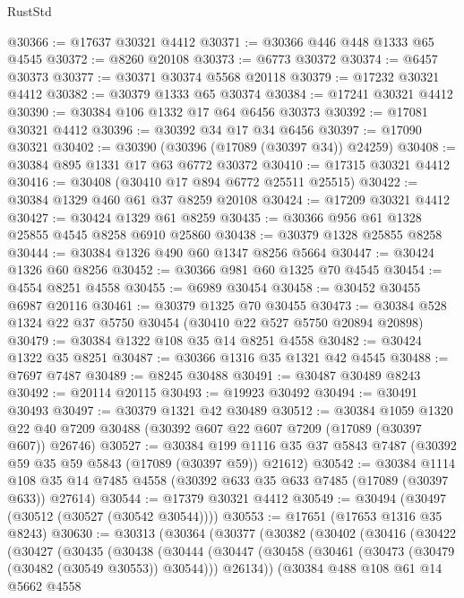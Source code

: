\begin{lexlean}{RustStd}
\begin{coremodule}
@30366 := @17637 @30321 @4412
@30371 := @30366 @446 @448 @1333 @65 @4545
@30372 := @8260 @20108
@30373 := @6773 @30372
@30374 := @6457 @30373
@30377 := @30371 @30374 @5568 @20118
@30379 := @17232 @30321 @4412
@30382 := @30379 @1333 @65 @30374
@30384 := @17241 @30321 @4412
@30390 := @30384 @106 @1332 @17 @64 @6456 @30373
@30392 := @17081 @30321 @4412
@30396 := @30392 @34 @17 @34 @6456
@30397 := @17090 @30321
@30402 := @30390 (@30396 (@17089 (@30397 @34)) @24259)
@30408 := @30384 @895 @1331 @17 @63 @6772 @30372
@30410 := @17315 @30321 @4412
@30416 := @30408 (@30410 @17 @894 @6772 @25511 @25515)
@30422 := @30384 @1329 @460 @61 @37 @8259 @20108
@30424 := @17209 @30321 @4412
@30427 := @30424 @1329 @61 @8259
@30435 := @30366 @956 @61 @1328 @25855 @4545 @8258 @6910 @25860
@30438 := @30379 @1328 @25855 @8258
@30444 := @30384 @1326 @490 @60 @1347 @8256 @5664
@30447 := @30424 @1326 @60 @8256
@30452 := @30366 @981 @60 @1325 @70 @4545
@30454 := @4554 @8251 @4558
@30455 := @6989 @30454
@30458 := @30452 @30455 @6987 @20116
@30461 := @30379 @1325 @70 @30455
@30473 := @30384 @528 @1324 @22 @37 @5750 @30454 (@30410 @22 @527 @5750 @20894 @20898)
@30479 := @30384 @1322 @108 @35 @14 @8251 @4558
@30482 := @30424 @1322 @35 @8251
@30487 := @30366 @1316 @35 @1321 @42 @4545
@30488 := @7697 @7487
@30489 := @8245 @30488
@30491 := @30487 @30489 @8243
@30492 := @20114 @20115
@30493 := @19923 @30492
@30494 := @30491 @30493
@30497 := @30379 @1321 @42 @30489
@30512 := @30384
    @1059
    @1320
    @22
    @40
    @7209
    @30488
    (@30392 @607 @22 @607 @7209 (@17089 (@30397 @607)) @26746)
@30527 := @30384
    @199
    @1116
    @35
    @37
    @5843
    @7487
    (@30392 @59 @35 @59 @5843 (@17089 (@30397 @59)) @21612)
@30542 := @30384
    @1114
    @108
    @35
    @14
    @7485
    @4558
    (@30392 @633 @35 @633 @7485 (@17089 (@30397 @633)) @27614)
@30544 := @17379 @30321 @4412
@30549 := @30494 (@30497 (@30512 (@30527 (@30542 @30544))))
@30553 := @17651 (@17653 @1316 @35 @8243)
@30630 := @30313
    (@30364
      (@30377
        (@30382
          (@30402
            (@30416
              (@30422
                (@30427
                  (@30435
                    (@30438
                      (@30444
                        (@30447
                          (@30458
                            (@30461 (@30473 (@30479 (@30482 (@30549 @30553)) @30544)))
                            @26134))
                        (@30384
                          @488
                          @108
                          @61
                          @14
                          @5662
                          @4558

\end{coremodule}
\end{lexlean}
